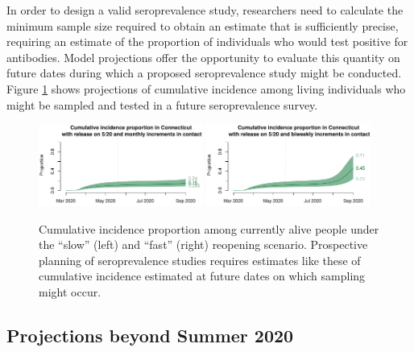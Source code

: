 \documentclass[11pt]{article}
\begin{document}
In order to design a valid seroprevalence study, researchers need to calculate the minimum sample size required to obtain an estimate that is sufficiently precise, requiring an estimate of the proportion of individuals who would test positive for antibodies.  Model projections offer the opportunity to evaluate this quantity on future dates during which a proposed seroprevalence study might be conducted.  Figure \ref{fig:cumincidence} shows projections of cumulative incidence among living individuals who might be sampled and tested in a future seroprevalence survey. 


\begin{figure}
\centering
\includegraphics[width=0.48\textwidth]{figures/cumincidence_slow.pdf}
\includegraphics[width=0.48\textwidth]{figures/cumincidence_fast.pdf}
\caption{Cumulative incidence proportion among currently alive people under the ``slow'' (left) and ``fast'' (right) reopening scenario. Prospective planning of seroprevalence studies requires estimates like these of cumulative incidence estimated at future dates on which sampling might occur. }
\label{fig:cumincidence}
\end{figure}



\subsection*{Projections beyond Summer 2020}
\end{document}
